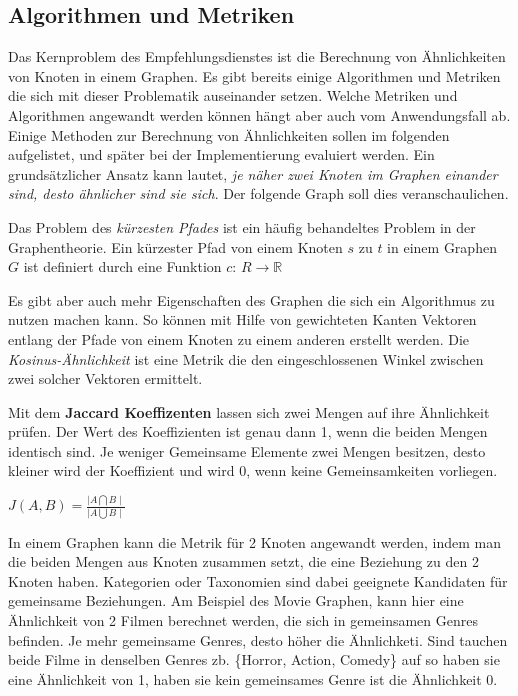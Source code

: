 \subsection{Algorithmen und Metriken}

Das Kernproblem des Empfehlungsdienstes ist die Berechnung von Ähnlichkeiten von Knoten in einem Graphen. Es gibt bereits einige Algorithmen und Metriken die sich mit dieser Problematik auseinander setzen. Welche Metriken und Algorithmen angewandt werden können hängt aber auch vom Anwendungsfall ab. Einige Methoden zur Berechnung von Ähnlichkeiten sollen im folgenden aufgelistet, und später bei der Implementierung evaluiert werden. Ein grundsätzlicher Ansatz kann lautet,\textit{ je näher zwei Knoten im Graphen einander sind, desto ähnlicher sind sie sich}. Der folgende Graph soll dies veranschaulichen. 

Das Problem des \textit{kürzesten Pfades} ist ein häufig behandeltes Problem in der Graphentheorie. Ein kürzester Pfad von einem Knoten $s$ zu $t$ in einem Graphen $G$ ist definiert durch eine Funktion $c$: $R \rightarrow \mathbb{R}$
\vspace{1em}

Es gibt aber auch mehr Eigenschaften des Graphen die sich ein Algorithmus zu nutzen machen kann. So können mit Hilfe von gewichteten Kanten Vektoren entlang der Pfade von einem Knoten zu einem anderen erstellt werden. Die \textit{Kosinus-Ähnlichkeit} ist eine Metrik die den eingeschlossenen Winkel zwischen zwei solcher Vektoren ermittelt.
\vspace{1em}

Mit dem \textbf{Jaccard Koeffizenten} lassen sich zwei Mengen auf ihre Ähnlichkeit prüfen. Der Wert des Koeffizienten ist  genau dann 1, wenn die beiden Mengen identisch sind. Je weniger Gemeinsame Elemente zwei Mengen besitzen, desto kleiner wird der  Koeffizient und wird 0, wenn keine Gemeinsamkeiten vorliegen.
\begin{center}
	$ J(A,B)=\frac{\mid A\bigcap B\mid }{ \mid A \bigcup B \mid }$

\end{center}
In einem Graphen kann die Metrik für 2 Knoten angewandt werden, indem man die beiden Mengen aus Knoten zusammen setzt, die eine Beziehung zu den 2 Knoten haben. Kategorien oder Taxonomien sind dabei geeignete Kandidaten für gemeinsame Beziehungen. Am Beispiel des Movie Graphen, kann hier eine Ähnlichkeit von 2 Filmen berechnet werden, die sich in gemeinsamen Genres befinden. Je mehr gemeinsame Genres, desto höher die Ähnlichketi. Sind tauchen beide Filme in denselben Genres zb. \{Horror, Action, Comedy\} auf so haben sie eine Ähnlichkeit von 1, haben sie kein gemeinsames Genre ist die Ähnlichkeit 0.
\vspace{1em}


